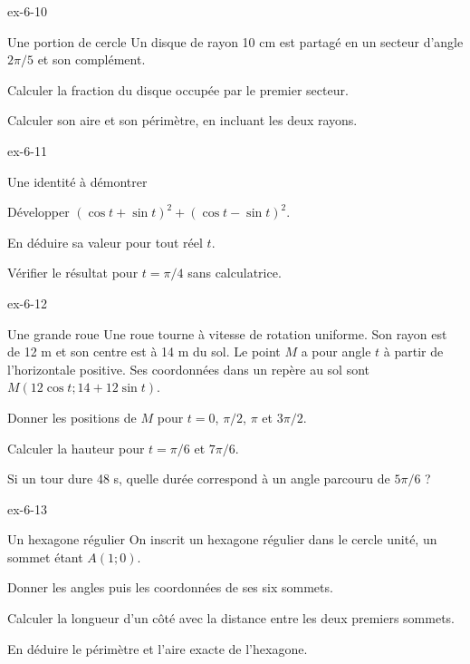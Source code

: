 \begin{blocLivre}{ex-6-10}
\begin{exercice}[2]{Une portion de cercle}
Un disque de rayon 10 cm est partagé en un secteur d’angle $2\pi/5$ et son complément.\begin{questions}
\item Calculer la fraction du disque occupée par le premier secteur.
\item Calculer son aire et son périmètre, en incluant les deux rayons.
\end{questions}

\label{figgeo-06-10-ex}
\end{exercice}
\end{blocLivre}
\begin{blocLivre}{ex-6-11}
\begin{exercice}[2]{Une identité à démontrer}
\begin{questions}
\item Développer $(\cos t+\sin t)^2+(\cos t-\sin t)^2$.
\item En déduire sa valeur pour tout réel $t$.
\item Vérifier le résultat pour $t=\pi/4$ sans calculatrice.
\end{questions}
\end{exercice}
\end{blocLivre}
\clearpage
{}
\begin{blocLivre}{ex-6-12}
\begin{exercice}[3]{Une grande roue}
Une roue tourne à vitesse de rotation uniforme. Son rayon est de 12 m et son centre est à 14 m du sol. Le point $M$ a pour angle $t$ à partir de l’horizontale positive. Ses coordonnées dans un repère au sol sont $M(12\cos t;14+12\sin t)$.\begin{questions}
\item Donner les positions de $M$ pour $t=0$, $\pi/2$, $\pi$ et $3\pi/2$.
\item Calculer la hauteur pour $t=\pi/6$ et $7\pi/6$.
\item Si un tour dure 48 s, quelle durée correspond à un angle parcouru de $5\pi/6$ ?
\end{questions}

\label{figgeo-06-12-ex}
\end{exercice}
\end{blocLivre}
\begin{blocLivre}{ex-6-13}
\begin{exercice}[3]{Un hexagone régulier}
On inscrit un hexagone régulier dans le cercle unité, un sommet étant $A(1;0)$.\begin{questions}
\item Donner les angles puis les coordonnées de ses six sommets.
\item Calculer la longueur d’un côté avec la distance entre les deux premiers sommets.
\item En déduire le périmètre et l’aire exacte de l’hexagone.
\end{questions}

\label{figgeo-06-13-ex}
\end{exercice}
\end{blocLivre}
